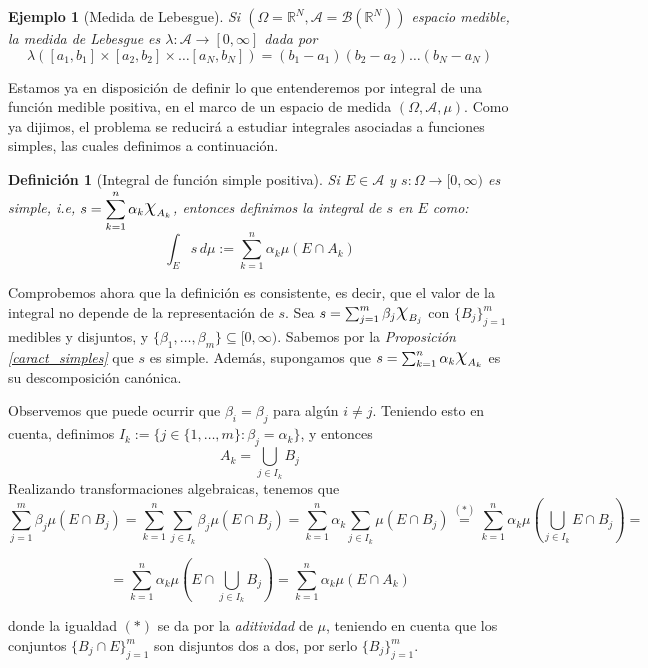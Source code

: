 \documentclass[11pt, a4paper]{article}
\newif\IfInSansMode
\DeclareRobustCommand{\rchi}{{\Large \mathpalette\irchi\relax}}
\newcommand{\irchi}[2]{\raisebox{0.4\depth}{$#1\chi$}} %
\newcommand{\W}{\Omega}
\theoremstyle{theorem-style}
\theoremstyle{definition-style}
\newtheorem{ndef}{Definición}[section]
\theoremstyle{remark-style}
\theoremstyle{example-style}
\newtheorem{ejemplo}{Ejemplo}[section]
\begin{document}
\begin{ejemplo}[Medida de Lebesgue]
	 Si $(\Omega = \mathbb R^N, \mathscr A= \mathcal B(\mathbb R^N))$ espacio medible, la medida de Lebesgue es $\lambda: \mathscr A \to [0,\infty]$ dada por  
 \[
 \lambda ([a_1,b_1]\times  [a_2,b_2]\times \dots [a_N,b_N]) = (b_1-a_1) (b_2-a_2) \dots (b_N-a_N)
 \]
\end{ejemplo}

Estamos ya en disposición de definir lo que entenderemos por integral de una función medible positiva, en el marco de un espacio de medida $(\W, \mathscr A, \mu)$. Como ya dijimos, el problema se reducirá a estudiar integrales asociadas a funciones simples, las cuales definimos a continuación.

\begin{ndef}[Integral de función simple positiva]
  Si $E \in \mathscr A$ y $s:\Omega \to [0,\infty)$ es simple, i.e, $\displaystyle s= \sum_{k=1}^n \alpha_k \rchi_{A_k}$, entonces definimos la integral de $s$ en $E$ como: 
  \[
    \int_E s\, d\mu := \sum_{k=1}^n \alpha_k \mu(E\cap A_k)
  \]
\end{ndef}

Comprobemos ahora que la definición es consistente, es decir, que el valor de la integral no depende de la representación de $s$. Sea $s = \sum_{j=1}^m \beta_j \rchi_{B_j}$ con $\{B_j\}_{j=1}^m$ medibles y disjuntos, y $\{\beta_1,\dots,\beta_m\} \subseteq [0,\infty)$. Sabemos por la \textit{Proposición \ref{caract_simples}} que $s$ es simple. Además, supongamos que $s= \sum_{k=1}^n \alpha_k \rchi_{A_k}$ es su descomposición canónica.

Observemos que puede ocurrir que $\beta_i = \beta_j$ para algún $i\neq j$. Teniendo esto en cuenta, definimos $I_k := \{j \in \{1,\dots,m\} : \beta_j = \alpha_k\}$, y entonces $$A_k = \bigcup_{j\in I_k} B_j$$ Realizando transformaciones algebraicas, tenemos que $$\sum_{j=1}^m \beta_j\mu(E \cap B_j) = \sum_{k=1}^n \sum_{j \in I_k} \beta_j \mu(E \cap B_j) = \sum_{k=1}^n \alpha_k \sum_{j \in I_k} \mu(E \cap B_j) \overset{(*)}{=} \sum_{k=1}^n \alpha_k  \mu \left(\bigcup_{j \in I_k} E \cap B_j \right) = $$ 

$$= \sum_{k=1}^n \alpha_k  \mu \left(E \cap\bigcup_{j \in I_k} B_j \right) = \sum_{k=1}^n \alpha_k  \mu (E \cap A_k)$$

donde la igualdad $(*)$ se da por la \textit{aditividad} de $\mu$, teniendo en cuenta que los conjuntos $\{B_j \cap E\}_{j=1}^m$ son disjuntos dos a dos, por serlo $\{B_j\}_{j=1}^m$.
\end{document}

